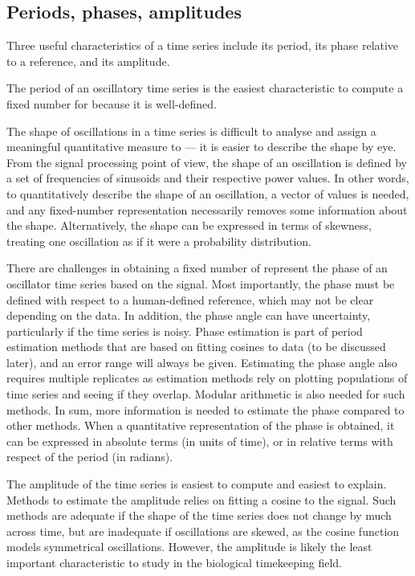 \subsection{Periods, phases, amplitudes}
\label{subsec:analysis-characterisation-quantities}

Three useful characteristics of a time series include its period, its phase relative to a reference, and its amplitude.

The period of an oscillatory time series is the easiest characteristic to compute a fixed number for because it is well-defined.

The shape of oscillations in a time series is difficult to analyse and assign a meaningful quantitative measure to --- it is easier to describe the shape by eye.
From the signal processing point of view, the shape of an oscillation is defined by a set of frequencies of sinusoids and their respective power values.
In other words, to quantitatively describe the shape of an oscillation, a vector of values is needed, and any fixed-number representation necessarily removes some information about the shape.
Alternatively, the shape can be expressed in terms of skewness, treating one oscillation as if it were a probability distribution. %

There are challenges in obtaining a fixed number of represent the phase of an oscillator time series based on the signal.
Most importantly, the phase must be defined with respect to a human-defined reference, which may not be clear depending on the data.
In addition, the phase angle can have uncertainty, particularly if the time series is noisy.
Phase estimation is part of period estimation methods that are based on fitting cosines to data (to be discussed later), and an error range will always be given.
Estimating the phase angle also requires multiple replicates as estimation methods rely on plotting populations of time series and seeing if they overlap.
Modular arithmetic is also needed for such methods.
In sum, more information is needed to estimate the phase compared to other methods.
When a quantitative representation of the phase is obtained, it can be expressed in absolute terms (in units of time), or in relative terms with respect of the period (in radians).

The amplitude of the time series is easiest to compute and easiest to explain.
Methods to estimate the amplitude relies on fitting a cosine to the signal.
Such methods are adequate if the shape of the time series does not change by much across time, but are inadequate if oscillations are skewed, as the cosine function models symmetrical oscillations.
However, the amplitude is likely the least important characteristic to study in the biological timekeeping field.

